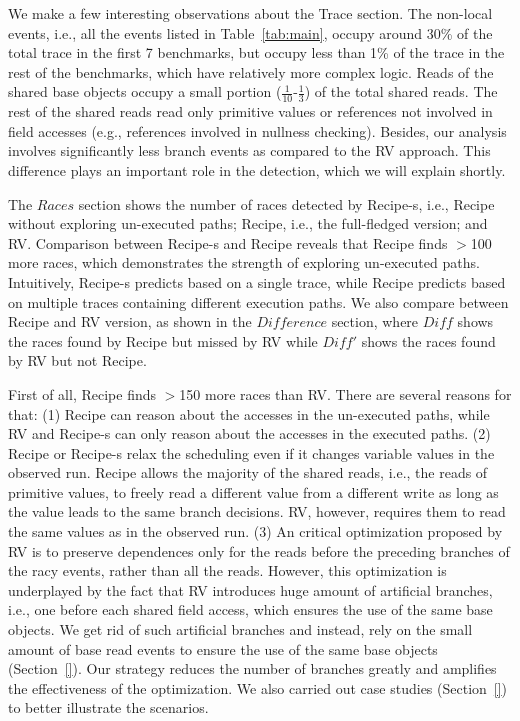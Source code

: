 We make a few interesting observations about the Trace section. 
The non-local events, i.e., all the events listed in Table~\ref{tab:main}, 
occupy around 30\% of the total trace in the first 7 benchmarks, 
but occupy less than 1\% of the trace in the rest of the benchmarks, 
which have relatively more complex logic. Reads of the shared base objects 
occupy a small portion ($\frac{1}{10}$-$\frac{1}{3}$) of the total 
shared reads. The rest of the shared reads read only primitive values 
or references not involved in field accesses (e.g., references involved 
in nullness checking). Besides, our analysis involves significantly less branch events as compared to the {\sf RV} approach. This difference plays an important role in the detection, which we will explain shortly.


The $Races$ section shows the number of races detected by {\sf Recipe-s}, 
i.e., {\sf Recipe} without exploring un-executed paths; {\sf Recipe}, i.e., the full-fledged version; and {\sf RV}. Comparison between {\sf Recipe-s} 
and {\sf Recipe} reveals that {\sf Recipe} finds $>$100 more races, 
which demonstrates the strength of exploring  un-executed paths. 
Intuitively,  {\sf Recipe-s} predicts based on a single trace, while 
{\sf Recipe} predicts based on multiple traces containing different 
execution paths. We also compare between {\sf Recipe} and {\sf RV} version, 
as shown in the $Difference$ section, where $Diff$ shows the races found 
by {\sf Recipe} but missed by {\sf RV} while $Diff'$ shows the races 
found by {\sf RV} but not {\sf Recipe}.

First of all, {\sf Recipe} finds $>$150 more races than {\sf RV}. There 
are several reasons for that: (1) {\sf Recipe} can reason about the 
accesses in the un-executed paths, while {\sf RV} and {\sf Recipe-s} can 
only reason about the accesses in the executed paths. (2) {\sf Recipe} 
or {\sf Recipe-s} relax the scheduling even if it 
changes variable values in the observed run. {\sf Recipe} allows the 
majority of the shared reads, i.e., the reads of primitive values, 
to freely read a different value from a different write 
as long as the value leads to the same branch decisions. {\sf RV}, however, 
requires them to read the same values as in the observed run. (3) An 
critical optimization proposed by {\sf RV} is to preserve dependences 
only for the reads before the preceding branches of the racy events, 
rather than all the reads. However, this optimization is underplayed 
by the fact that {\sf RV} introduces huge amount of artificial 
branches, i.e., one before each shared field access, which ensures 
the use of the same base objects.
We get rid of such artificial branches and instead, rely on the small 
amount of base read events to ensure the use of the same base 
objects (Section~\ref{}). Our strategy reduces the number of branches 
greatly and amplifies the effectiveness of the optimization. We also 
carried out case studies (Section~\ref{}) to better illustrate the scenarios.

